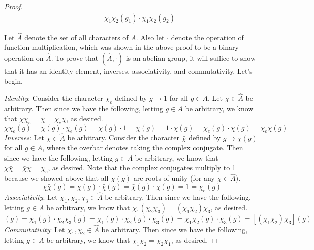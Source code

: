 \documentclass[../psets.tex]{subfiles}
\begin{document}
\begin{enumerate}
\begin{enumerate}
\begin{proof}
\begin{align*}
                &= \chi_1\chi_2(g_1)\cdot\chi_1\chi_2(g_2)
            \end{align*}\par\smallskip
            Let $\widehat{A}$ denote the set of all characters of $A$. Also let $\cdot$ denote the operation of function multiplication, which was shown in the above proof to be a binary operation on $\widehat{A}$. To prove that $(\widehat{A},\cdot)$ is an abelian group, it will suffice to show that it has an identity element, inverses, associativity, and commutativity. Let's begin.\par
            \emph{Identity}: Consider the character $\chi_e$ defined by $g\mapsto 1$ for all $g\in A$. Let $\chi\in\widehat{A}$ be arbitrary. Then since we have the following, letting $g\in A$ be arbitrary, we know that $\chi\chi_e=\chi=\chi_e\chi$, as desired.
            \begin{equation*}
                \chi\chi_e(g) = \chi(g)\cdot\chi_e(g)
                = \chi(g)\cdot 1
                = \chi(g)
                = 1\cdot\chi(g)
                = \chi_e(g)\cdot\chi(g)
                = \chi_e\chi(g)
            \end{equation*}
            \emph{Inverses}: Let $\chi\in\widehat{A}$ be arbitrary. Consider the character $\bar{\chi}$ defined by $g\mapsto\overline{\chi(g)}$ for all $g\in A$, where the overbar denotes taking the complex conjugate. Then since we have the following, letting $g\in A$ be arbitrary, we know that $\chi\bar{\chi}=\bar{\chi}\chi=\chi_e$, as desired. Note that the complex conjugates multiply to 1 because we showed above that all $\chi(g)$ are roots of unity (for any $\chi\in\widehat{A}$).
            \begin{equation*}
                \chi\bar{\chi}(g) = \chi(g)\cdot\bar{\chi}(g)
                = \bar{\chi}(g)\cdot\chi(g)
                = 1
                = \chi_e(g)
            \end{equation*}
            \emph{Associativity}: Let $\chi_1,\chi_2,\chi_3\in\widehat{A}$ be arbitrary. Then since we have the following, letting $g\in A$ be arbitrary, we know that $\chi_1(\chi_2\chi_3)=(\chi_1\chi_2)\chi_3$, as desired.
            \begin{equation*}
                [\chi_1(\chi_2\chi_3)](g) = \chi_1(g)\cdot\chi_2\chi_3(g)
                = \chi_1(g)\cdot\chi_2(g)\cdot\chi_3(g)
                = \chi_1\chi_2(g)\cdot\chi_3(g)
                = [(\chi_1\chi_2)\chi_3](g)
            \end{equation*}
            \emph{Commutativity}: Let $\chi_1,\chi_2\in\widehat{A}$ be arbitrary. Then since we have the following, letting $g\in A$ be arbitrary, we know that $\chi_1\chi_2=\chi_2\chi_1$, as desired.

\end{proof}
\end{enumerate}
\end{enumerate}
\end{document}
